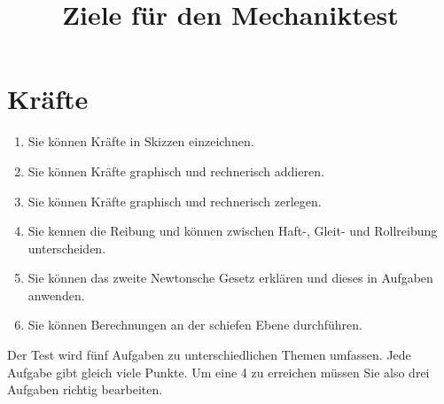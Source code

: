 \documentclass[12pt,a4paper,twoside]{article}
\title{Ziele für den Mechaniktest}
\date{}
\begin{document}
\maketitle

\section*{Kräfte}

\begin{enumerate}
	\item Sie können Kräfte in Skizzen einzeichnen.
	\item Sie können Kräfte graphisch und rechnerisch addieren.
	\item Sie können Kräfte graphisch und rechnerisch zerlegen.
	\item Sie kennen die Reibung und können zwischen Haft-, Gleit- und Rollreibung unterscheiden.
	\item Sie können das zweite Newtonsche Gesetz erklären und dieses in Aufgaben anwenden.
	\item Sie können Berechnungen an der schiefen Ebene durchführen.

\end{enumerate}

Der Test wird fünf Aufgaben zu unterschiedlichen Themen umfassen. Jede Aufgabe gibt gleich viele Punkte.
Um eine 4 zu erreichen müssen Sie also drei Aufgaben richtig bearbeiten.
\end{document}
